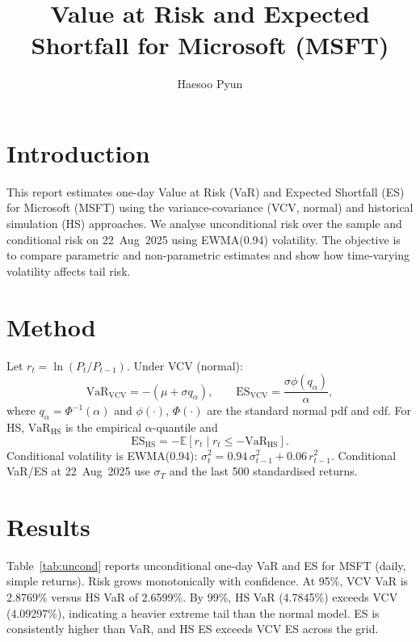 \documentclass[11pt]{article}
\title{Value at Risk and Expected Shortfall for Microsoft (MSFT)}
\author{Haesoo Pyun}
\date{}
\begin{document}
\maketitle

\section*{Introduction}
This report estimates one-day Value at Risk (VaR) and Expected Shortfall (ES) for Microsoft (MSFT) using the variance-covariance (VCV, normal) and historical simulation (HS) approaches. We analyse unconditional risk over the sample and conditional risk on 22~Aug~2025 using EWMA(0.94) volatility. The objective is to compare parametric and non-parametric estimates and show how time-varying volatility affects tail risk.

\section*{Method}
Let $r_t=\ln(P_t/P_{t-1})$. Under VCV (normal):
\[
\mathrm{VaR}_{\mathrm{VCV}} = -(\mu + \sigma q_\alpha),\qquad
\mathrm{ES}_{\mathrm{VCV}} = \frac{\sigma \phi(q_\alpha)}{\alpha},
\]
where $q_\alpha=\Phi^{-1}(\alpha)$ and $\phi(\cdot)$, $\Phi(\cdot)$ are the standard normal pdf and cdf.
For HS, $\mathrm{VaR}_{\mathrm{HS}}$ is the empirical $\alpha$-quantile and
\[
\mathrm{ES}_{\mathrm{HS}} = -\mathbb{E}[r_t \mid r_t \le -\mathrm{VaR}_{\mathrm{HS}}].
\]
Conditional volatility is EWMA(0.94): $\sigma_t^2=0.94\,\sigma_{t-1}^2+0.06\,r_{t-1}^2$.
Conditional VaR/ES at 22~Aug~2025 use $\sigma_T$ and the last 500 standardised returns.

\newpage
\section*{Results}
Table~\ref{tab:uncond} reports unconditional one-day VaR and ES for MSFT (daily, simple returns).
Risk grows monotonically with confidence. At 95\%, VCV VaR is 2.8769\% versus HS VaR of 2.6599\%. By 99\%, HS VaR (4.7845\%) exceeds VCV (4.09297\%), indicating a heavier extreme tail than the normal model. ES is consistently higher than VaR, and HS ES exceeds VCV ES across the grid.
\end{document}
